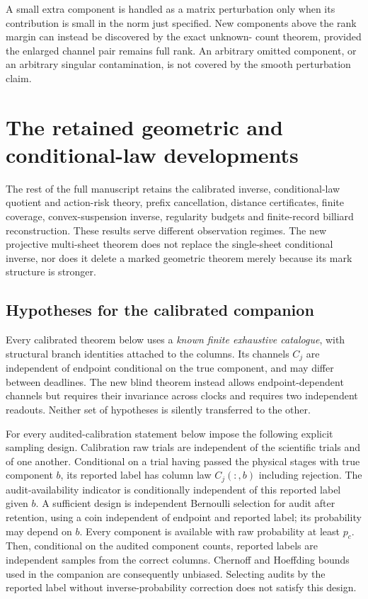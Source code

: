 A small extra component is handled as a matrix perturbation only when
its contribution is small in the norm just specified.  New components
above the rank margin can instead be discovered by the exact unknown-
count theorem, provided the enlarged channel pair remains full rank.
An arbitrary omitted component, or an arbitrary singular contamination,
is not covered by the smooth perturbation claim.

\section{The retained geometric and conditional-law developments}
\label{sec:v81-retained}

The rest of the full manuscript retains the calibrated inverse,
conditional-law quotient and action-risk theory, prefix cancellation,
distance certificates, finite coverage, convex-suspension inverse,
regularity budgets and finite-record billiard reconstruction.  These
results serve different observation regimes.  The new projective
multi-sheet theorem does not replace the single-sheet conditional
inverse, nor does it delete a marked geometric theorem merely because
its mark structure is stronger.

\subsection{Hypotheses for the calibrated companion}

Every calibrated theorem below uses a \emph{known finite exhaustive
catalogue}, with structural branch identities attached to the columns.
Its channels $C_j$ are independent of endpoint conditional on the true
component, and may differ between deadlines.  The new blind theorem
instead allows endpoint-dependent channels but requires their invariance
across clocks and requires two independent readouts.  Neither set of
hypotheses is silently transferred to the other.

For every audited-calibration statement below impose the following
explicit sampling design.  Calibration raw trials are independent of
the scientific trials and of one another.  Conditional on a trial having
passed the physical stages with true component $b$, its reported label
has column law $C_j(:,b)$ including rejection.  The audit-availability
indicator is conditionally independent of this reported label given
$b$.  A sufficient design is independent Bernoulli selection for audit
after retention, using a coin independent of endpoint and reported
label; its probability may depend on $b$.  Every component is available
with raw probability at least $p_c$.  Then, conditional on the audited
component counts, reported labels are independent samples from the
correct columns.  Chernoff and Hoeffding bounds used in the companion
are consequently unbiased.  Selecting audits by the reported label
without inverse-probability correction does not satisfy this design.

